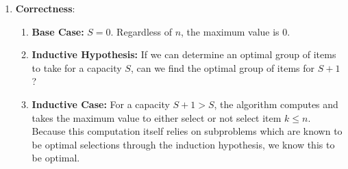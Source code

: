 \documentclass{article}
\begin{document}
\begin{enumerate}
\begin{enumerate}
            \item \textbf{Correctness}:
                \begin{enumerate}
                    \item \textbf{Base Case:} $S = 0$. Regardless of $n$, the maximum value is 0.
                    \item \textbf{Inductive Hypothesis:} If we can determine an optimal group of items to take
                        for a capacity $S$, can we find the optimal group of items for $S + 1$?
                    \item \textbf{Inductive Case:}
                        For a capacity $S + 1 > S$, the algorithm computes and takes the maximum value
                        to either select or not select item $k \leq n$. Because this computation itself
                        relies on subproblems which are known to be optimal selections through the induction
                        hypothesis, we know this to be optimal.
                \end{enumerate}
            
        \end{enumerate}
\end{enumerate}
\end{document}
